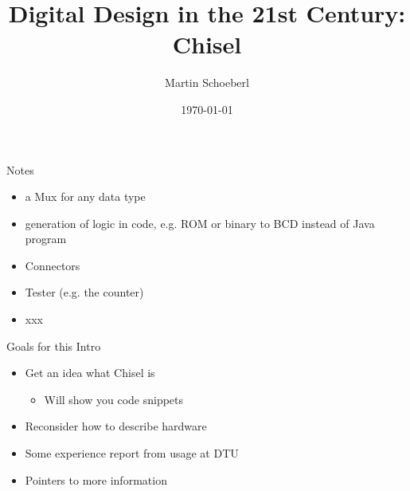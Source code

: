\documentclass[xcolor=pdflatex,dvipsnames,table]{beamer}
\title{Digital Design in the 21st Century: Chisel}
\author{Martin Schoeberl}
\date{\today}
\institute{DTU Compute}
\begin{document}
\begin{frame}
\titlepage
\end{frame}

\begin{frame}[fragile]{Notes}
\begin{itemize}
\item a Mux for any data type
\item generation of logic in code, e.g. ROM or binary to BCD instead of Java program
\item Connectors
\item Tester (e.g. the counter)
\item xxx
\end{itemize}
\end{frame}


\begin{frame}[fragile]{Goals for this Intro}
\begin{itemize}
\item Get an idea what Chisel is
\begin{itemize}
\item Will show you code snippets
\end{itemize}
\item Reconsider how to describe hardware
\item Some experience report from usage at DTU
\item Pointers to more information
\end{itemize}
\end{frame}

%
%
%
%
\end{document}

